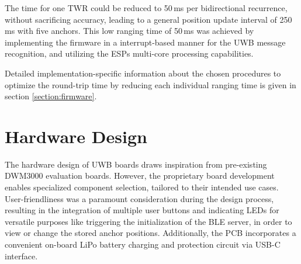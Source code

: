 \documentclass[final, conference, a4paper]{IEEEtran}
\begin{document}
The time for one \ac{TWR} could be reduced to 50\,ms per bidirectional recurrence, without sacrificing accuracy,
leading to a general position update interval of 250\,ms with five anchors. 
This low ranging time of 50\,ms was achieved by implementing the firmware in a interrupt-based manner for the \ac{UWB} message recognition, and utilizing the ESPs multi-core processing capabilities.

Detailed implementation-specific information about the chosen procedures to optimize the round-trip time by reducing each individual ranging time
is given in section \ref{section:firmware}.


\section{Hardware Design}\label{section:hardware}
The hardware design of \ac{UWB} boards draws inspiration from pre-existing DWM3000 evaluation
boards.
However, the proprietary board development enables specialized component selection, tailored to their intended use cases.
User-friendliness was a paramount consideration during the design process,
resulting in the integration of multiple user buttons and indicating LEDs for versatile purposes like triggering the initialization of the \ac{BLE} server, in order to view or change the stored anchor positions. 
Additionally, the PCB incorporates a convenient on-board LiPo battery charging and protection circuit via USB-C interface.
\end{document}
